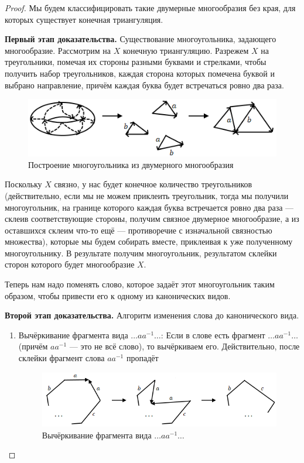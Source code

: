 \begin{proof}
    Мы будем классифицировать такие двумерные многообразия без края, для которых существует конечная триангуляция.
    
    \textbf{Первый этап доказательства.} Существование многоугольника, задающего многообразие.
    Рассмотрим на $X$ конечную триангуляцию. Разрежем $X$ на треугольники, помечая их стороны разными буквами и стрелками, чтобы получить набор треугольников, каждая сторона которых помечена буквой и выбрано направление, причём каждая буква будет встречаться ровно два раза.

    \begin{figure}[htbp]
        \centering
        \includegraphics[scale=1]{images/c10.3.png}
        \caption{Построение многоугольника из двумерного многообразия}
        \label{fig:c10.3}
    \end{figure}

    Поскольку $X$ связно, у нас будет конечное количество треугольников (действительно, если мы не можем приклеить треугольник, тогда мы получили многоугольник, на границе которого каждая буква встречается ровно два раза — склеив соответствующие стороны, получим связное двумерное многообразие, а из оставшихся склеим что-то ещё — противоречие с изначальной связностью множества), которые мы будем собирать вместе, приклеивая к уже полученному многоугольнику. В результате получим многоугольник, результатом склейки сторон которого будет многообразие $X$.

    Теперь нам надо поменять слово, которое задаёт этот многоугольник таким образом, чтобы привести его к одному из канонических видов.

    \textbf{Второй этап доказательства.} Алгоритм изменения слова до канонического вида.
    \begin{enumerate}
        \item Вычёркивание фрагмента вида $\dots a a^{-1} \dots$:
        Если в слове есть фрагмент $\dots a a^{-1} \dots$ (причём $a a^{-1}$ — это не всё слово), то вычёркиваем его. Действительно, после склейки фрагмент слова $aa^{-1}$ пропадёт 

        \begin{figure}[htbp]
            \centering
            \includegraphics[scale=0.7]{images/c10.4.png}
            \caption{Вычёркивание фрагмента вида $\dots a a^{-1} \dots$}
            \label{fig:c10.4}
        \end{figure}


\end{enumerate}
\end{proof}
